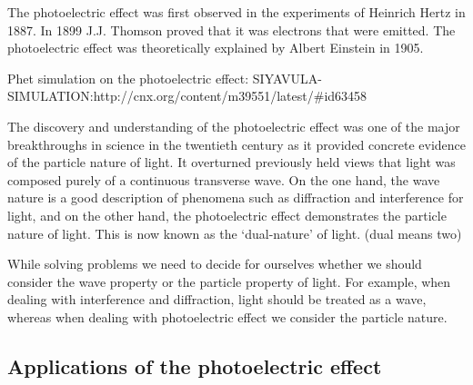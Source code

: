 \begin{IFact}
{The photoelectric effect was first observed in the experiments of Heinrich Hertz in 1887. In 1899 J.J. Thomson proved that it was electrons that were emitted. The photoelectric effect was theoretically explained by Albert Einstein in 1905.}
\end{IFact}
Phet simulation on the photoelectric effect: SIYAVULA-SIMULATION:http://cnx.org/content/m39551/latest/#id63458

 
The discovery and understanding of the photoelectric effect was one of the major breakthroughs in science in the twentieth century as it provided concrete evidence of the particle nature of light. It overturned previously held views that light was composed purely of a continuous transverse wave. On the one hand, the wave nature is a good description of phenomena such as diffraction and interference for light, and on the other hand, the photoelectric effect demonstrates the particle nature of light. This is now known as the `dual-nature' of light. (dual means two)

 
While solving problems we need to decide for ourselves whether we should consider the wave property or the particle property of light. For example, when dealing with interference and diffraction, light should be treated as a wave, whereas when dealing with photoelectric effect we consider the particle nature.
 
\subsection{Applications of the photoelectric effect}

